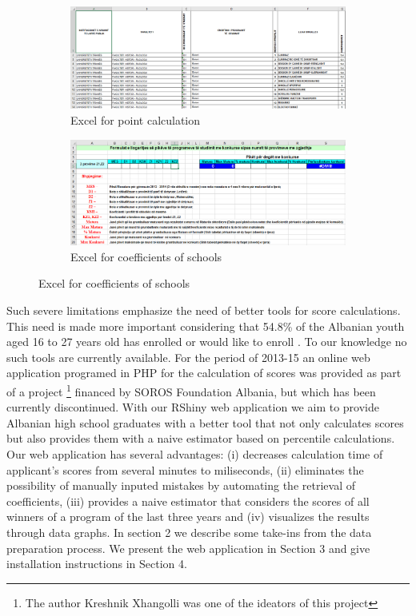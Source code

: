 \documentclass{article}
\begin{document}
\begin{figure}[h]
	\caption{Tools provided by MoE and ENA}
	\centering
	\begin{subfigure}{0.49\linewidth}
		\caption{Excel for point calculation}
		\label{tb:coeff-calc}
		\centering
		\includegraphics[width=\textwidth]{../Figures/excel_coeff.png}	
	\end{subfigure}
	\hfill
	\begin{subfigure}{0.49\linewidth}
		\caption{Excel for coefficients of schools}
		\label{tb:points-calc}
		\centering
		\includegraphics[width=\textwidth]{../Figures/excel_piket.png}
	\end{subfigure}	
\end{figure}

Such severe limitations emphasize the need of better tools for score calculations. This need is made more important considering that 54.8\% of the Albanian youth aged 16 to 27 years old has enrolled or would like to enroll \cite{FES2015}. To our knowledge no such tools are currently available. For the period of 2013-15 an online web application programed in PHP for the calculation of scores was provided as part of a project \footnote{The author Kreshnik Xhangolli was one of the ideators of this project} financed by SOROS Foundation Albania, but which has been currently discontinued. With our RShiny web application we aim to provide Albanian high school graduates with a better tool that not only calculates scores but also provides them with a naive estimator based on percentile calculations. Our web application has several advantages:
(i) decreases calculation time of applicant's scores from several minutes to miliseconds, (ii) eliminates the possibility of manually inputed mistakes by automating the retrieval of coefficients, (iii) provides a naive estimator that considers the scores of all winners of a program of the last three years and (iv) visualizes the results through data graphs. In section 2 we describe some take-ins from the data preparation process. We present the web application in Section 3 and give installation instructions in Section 4.  
\end{document}
